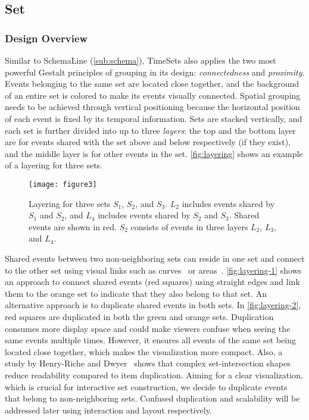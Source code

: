 \subsection{Set}
\subsubsection{Design Overview}
Similar to SchemaLine (\autoref{sub:schema}), TimeSets also applies the two most powerful Gestalt principles of grouping in its design: \emph{connectedness} and \emph{proximity}. Events belonging to the same set are located close together, and the background of an entire set is colored to make its events visually connected. Spatial grouping needs to be achieved through vertical positioning because the horizontal position of each event is fixed by its temporal information. Sets are stacked vertically, and each set is further divided into up to three \emph{layers}: the top and the bottom layer are for events shared with the set above and below respectively (if they exist), and the middle layer is for other events in the set. \autoref{fig:layering} shows an example of a layering for three sets.

\begin{figure}[!htb]
\centering
\texttt{[image: figure3]}
\caption{Layering for three sets $S_1$, $S_2$, and $S_3$. $L_2$ includes events shared by $S_1$ and $S_2$, and $L_4$ includes events shared by $S_2$ and $S_3$. Shared events are shown in red. $S_2$ consists of events in three layers $L_2$, $L_3$, and $L_4$.}
\label{fig:layering}
\end{figure}

Shared events between two non-neighboring sets can reside in one set and connect to the other set using visual links such as curves~\cite{Alper2011} or areas~\cite{Meulemans2013}. \autoref{fig:layering-1} shows an approach to connect shared events (red squares) using straight edges and link them to the orange set to indicate that they also belong to that set. An alternative approach is to duplicate shared events in both sets. In \autoref{fig:layering-2}, red squares are duplicated in both the green and orange sets. Duplication consumes more display space and could make viewers confuse when seeing the same events multiple times. However, it ensures all events of the same set being located close together, which makes the visualization more compact. Also, a study by Henry-Riche and Dwyer~\cite{Riche2010} shows that complex set-intersection shapes reduce readability compared to item duplication. Aiming for a clear visualization, which is crucial for interactive set construction, we decide to duplicate events that belong to non-neighboring sets. Confused duplication and scalability will be addressed later using interaction and layout respectively.

